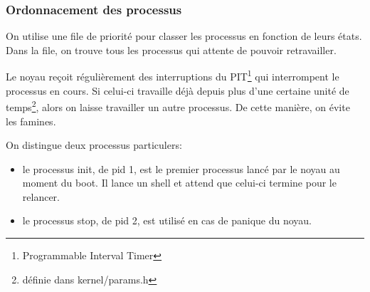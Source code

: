\documentclass[10pt,a4paper]{beamer}
\begin{document}
\begin{frame}
  \frametitle{Ordonnacement des processus}
  On utilise une file de priorité pour classer les processus en fonction de leurs états. Dans la file, on trouve tous les processus qui attente de pouvoir retravailler.

  Le noyau reçoit régulièrement des interruptions du PIT\footnote{Programmable Interval Timer} qui interrompent le processus en cours. Si celui-ci travaille déjà depuis plus d'une certaine unité de temps\footnote{définie dans kernel/params.h}, alors on laisse travailler un autre processus. De cette manière, on évite les famines.

  On distingue deux processus particulers:
  \begin{itemize}
  \item le processus \textrm{init}, de pid 1, est le premier processus lancé par le noyau au moment du boot. Il lance un shell et attend que celui-ci termine pour le relancer.
  \item le processus \textrm{stop}, de pid 2, est utilisé en cas de panique du noyau.
  \end{itemize}

\end{frame}
\end{document}
